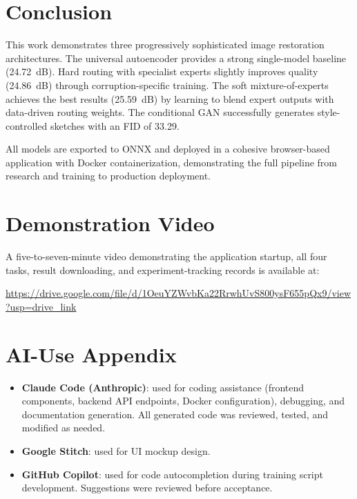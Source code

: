\documentclass[conference]{IEEEtran}
\begin{document}
\section{Conclusion}

This work demonstrates three progressively sophisticated image restoration architectures. The universal autoencoder provides a strong single-model baseline (24.72~dB). Hard routing with specialist experts slightly improves quality (24.86~dB) through corruption-specific training. The soft mixture-of-experts achieves the best results (25.59~dB) by learning to blend expert outputs with data-driven routing weights. The conditional GAN successfully generates style-controlled sketches with an FID of 33.29.

All models are exported to ONNX and deployed in a cohesive browser-based application with Docker containerization, demonstrating the full pipeline from research and training to production deployment.

\section*{Demonstration Video}

A five-to-seven-minute video demonstrating the application startup, all four tasks, result downloading, and experiment-tracking records is available at:

\url{https://drive.google.com/file/d/1OeuYZWvbKa22RrwhUvS800ysF655pQx9/view?usp=drive_link}

\section*{AI-Use Appendix}

\begin{itemize}
    \item \textbf{Claude Code (Anthropic)}: used for coding assistance (frontend components, backend API endpoints, Docker configuration), debugging, and documentation generation. All generated code was reviewed, tested, and modified as needed.
    \item \textbf{Google Stitch}: used for UI mockup design.
    \item \textbf{GitHub Copilot}: used for code autocompletion during training script development. Suggestions were reviewed before acceptance.
\end{itemize}
\end{document}
